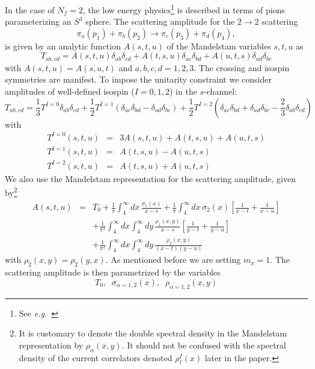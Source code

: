\documentclass[12pt,letterpaper]{article}
\def\a {\alpha}
\newcommand{\eg}{{\it e.g.}}
\newcommand{\beq}{\begin{equation}}
\newcommand{\eeq}{\end{equation}}
\newcommand{\beqa}{\begin{eqnarray}}
\newcommand{\eeqa}{\end{eqnarray}}
\newcommand{\half}{\ensuremath{\frac{1}{2}}}
\newcommand{\intxy}{\ensuremath{\int_4^\infty\!\!\!\!\!\! dx \int_4^\infty\!\!\!\!\!\! dy\,}}
\newcommand{\intx}{\ensuremath{\int_4^\infty\!\!\!\!\!\! dx\,}}
\begin{document}
  In the case of $N_f=2$, the low energy physics\footnote{See \eg\ \cite{donoghue_golowich_holstein_2014}} is described in terms of pions parameterizing an $S^3$ sphere. The scattering amplitude for the $2\rightarrow 2$ scattering
\beq
\pi_a(p_1) + \pi_b(p_2) \rightarrow \pi_c(p_3) +\pi_d(p_4), 
\label{b2}
\eeq
is given by an analytic function $A(s,t,u)$ of the Mandelstam variables $s,t,u$ as
\beq
T_{ab,cd} = A(s,t,u) \delta_{ab} \delta_{cd} + A(t,s,u) \delta_{ac} \delta_{bd} + A(u,t,s) \delta_{ad}\delta_{bc} 
\label{a8}
\eeq
with $A(s,t,u)=A(s,u,t)$ and $a,b,c,d=1,2,3$. The crossing and isospin symmetries are manifest. To impose the unitarity constraint we consider amplitudes of well-defined isospin ($I=0,1,2$) in the $s$-channel:
\beq
T_{ab,cd} = \frac{1}{3} T^{I=0} \delta_{ab}\delta_{cd} + \frac{1}{2} T^{I=1} (\delta_{ac}\delta_{bd}-\delta_{ad}\delta_{bc}) + \half T^{I=2} (\delta_{ac}\delta_{bd}+\delta_{ad}\delta_{bc}-\frac{2}{3}\delta_{ab}\delta_{cd})  
\label{a9}
\eeq 
with 
\begin{subequations}\label{a10}
	\beqa	
	T^{I=0}(s,t,u) &=& 3 A(s,t,u)+A(t,s,u)+A(u,t,s) \\ 
	T^{I=1}(s,t,u) &=& A(t,s,u)-A(u,t,s) \\ 
	T^{I=2}(s,t,u) &=& A(t,s,u)+A(u,t,s) 
	\eeqa
\end{subequations}
We also use the Mandelstam representation for the scattering amplitude, given by\footnote{It is customary to denote the double spectral density in the Mandelstam representation by $\rho_\alpha(x,y)$. It should not be confused with the spectral density of the current correlators denoted $\rho^I_\ell(x)$ later in the paper.}
\beqa\label{Adef}
A(s,t,u) &=& T_0 + \frac{1}{\pi} \intx  \frac{\sigma_1(x)}{x-s}+\frac{1}{\pi} \intx \sigma_2(x) \left[\frac{1}{x-t}+\frac{1}{x-u}\right]\nonumber \\ 
         && +  \frac{1}{\pi^2}  \intxy  \frac{\rho_1(x,y)}{x-s}\left[\frac{1}{y-t}+\frac{1}{y-u}\right] \nonumber\\
         && +  \frac{1}{\pi^2}  \intxy   \frac{\rho_2(x,y)}{(x-t)(y-u)}
\label{a11}
\eeqa
with $\rho_2(x,y)=\rho_2(y,x)$. As mentioned before we are setting $m_\pi=1$. The scattering amplitude is then parametrized by the variables
\begin{equation}\label{Apara}
	T_0,\;\; \sigma_{\a=1,2}(x),\;\; \rho_{\a=1,2}(x,y)
\end{equation}
\end{document}
